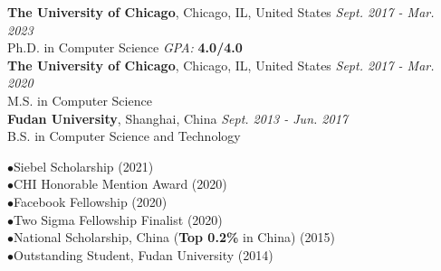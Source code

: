 \documentclass[10pt,letterpaper]{article}
\newenvironment{cvsec}[1]{\par\vspace{10pt}\begin{list}{}{\setlength{\leftmargin}{1.15in}\setlength{\labelwidth}{1.1in}\setlength{\labelsep}{0.05in}\setlength{\topsep}{0pt}}\item[{\parbox[t]{1.1in}{\raggedright\textsc{#1}}}]}{\end{list}}
\begin{document}
\begin{cvsec}{Education}
\textbf{The University of Chicago}, Chicago, IL, United States \hfill \textit{Sept. 2017 - Mar. 2023}\\
Ph.D. in Computer Science \hfill \textit{GPA:} \textbf{4.0/4.0}\hspace*{1.3in}\\[6pt]
\textbf{The University of Chicago}, Chicago, IL, United States \hfill \textit{Sept. 2017 - Mar. 2020}\\
M.S. in Computer Science\\[6pt]
\textbf{Fudan University}, Shanghai, China \hfill \textit{Sept. 2013 - Jun. 2017}\\
B.S. in Computer Science and Technology
\end{cvsec}

\begin{cvsec}{Awards}
\hspace*{0.6em}$\bullet$\hspace{0.6em}Siebel Scholarship (2021)\\[2pt]
\hspace*{0.6em}$\bullet$\hspace{0.6em}CHI Honorable Mention Award (2020)\\[2pt]
\hspace*{0.6em}$\bullet$\hspace{0.6em}Facebook Fellowship (2020)\\[2pt]
\hspace*{0.6em}$\bullet$\hspace{0.6em}Two Sigma Fellowship Finalist (2020)\\[2pt]
\hspace*{0.6em}$\bullet$\hspace{0.6em}National Scholarship, China (\textbf{Top 0.2\%} in China) (2015)\\[2pt]
\hspace*{0.6em}$\bullet$\hspace{0.6em}Outstanding Student, Fudan University (2014)
\end{cvsec}
\end{document}
